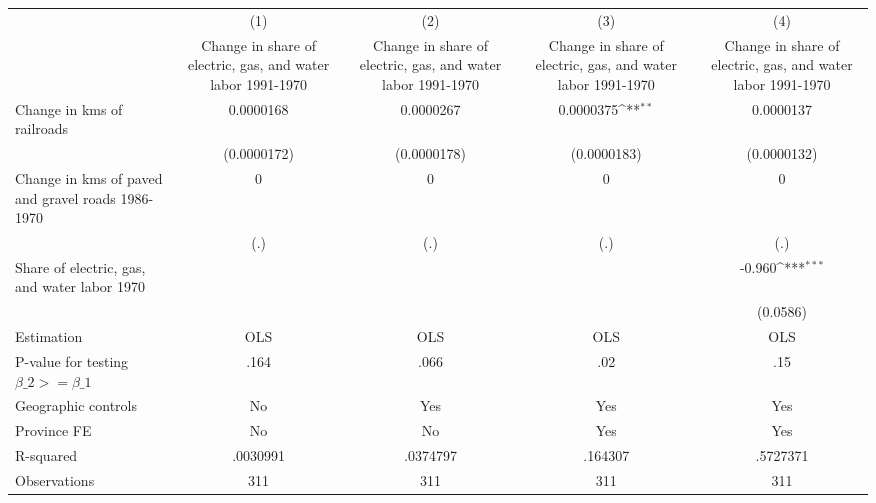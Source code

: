 {
\def\sym#1{\ifmmode^{#1}\else\(^{#1}\)\fi}
\begin{tabular}{l*{4}{c}}
\hline\hline
                &\multicolumn{1}{c}{(1)}&\multicolumn{1}{c}{(2)}&\multicolumn{1}{c}{(3)}&\multicolumn{1}{c}{(4)}\\
                &\multicolumn{1}{c}{Change in share of electric, gas, and water labor 1991-1970}&\multicolumn{1}{c}{Change in share of electric, gas, and water labor 1991-1970}&\multicolumn{1}{c}{Change in share of electric, gas, and water labor 1991-1970}&\multicolumn{1}{c}{Change in share of electric, gas, and water labor 1991-1970}\\
\hline
Change in kms of railroads&0.0000168         &0.0000267         &0.0000375\sym{**} &0.0000137         \\
                &(0.0000172)         &(0.0000178)         &(0.0000183)         &(0.0000132)         \\
[1em]
Change in kms of paved and gravel roads 1986-1970&        0         &        0         &        0         &        0         \\
                &      (.)         &      (.)         &      (.)         &      (.)         \\
[1em]
Share of electric, gas, and water labor 1970&                  &                  &                  &   -0.960\sym{***}\\
                &                  &                  &                  & (0.0586)         \\
\hline
Estimation      &      OLS         &      OLS         &      OLS         &      OLS         \\
P-value for testing $\beta\_2 >= \beta\_1$&     .164         &     .066         &      .02         &      .15         \\
Geographic controls&       No         &      Yes         &      Yes         &      Yes         \\
Province FE     &       No         &       No         &      Yes         &      Yes         \\
R-squared       & .0030991         & .0374797         &  .164307         & .5727371         \\
Observations    &      311         &      311         &      311         &      311         \\
\hline\hline
\end{tabular}
}
